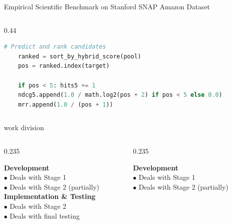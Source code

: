 \documentclass[10pt]{beamer}
\begin{document}
\begin{frame}[fragile]{Empirical Scientific Benchmark on Stanford SNAP Amazon Dataset}
\begin{columns}[T]
\begin{column}{0.44\textwidth}
\begin{lstlisting}[language=Python]
    # Predict and rank candidates
    ranked = sort_by_hybrid_score(pool)
    pos = ranked.index(target)
    
    if pos < 5: hits5 += 1
    ndcg5.append(1.0 / math.log2(pos + 2) if pos < 5 else 0.0)
    mrr.append(1.0 / (pos + 1))
\end{lstlisting}
    \end{column}
\end{columns}
\end{frame}

\begin{frame}{work division}
\vspace*{0.3cm}
\begin{columns}[T]
    \begin{column}{0.235\textwidth}
        \begin{tcolorbox}[colback=cardbg,colframe=bordergray,arc=2.5mm,boxrule=1pt,top=6mm,bottom=6mm,left=4mm,right=4mm]
            {\fontsize{9}{12}\selectfont \textbf{\color{brandorange} Development}}\\[0.15cm]
            {\fontsize{8}{11}\selectfont $\bullet$ Deals with Stage 1}\\[0.08cm]
            {\fontsize{8}{11}\selectfont $\bullet$ Deals with Stage 2 (partially)}\\[0.55cm]
            {\fontsize{9}{12}\selectfont \textbf{\color{brandred} Implementation \& Testing}}\\[0.15cm]
            {\fontsize{8}{11}\selectfont $\bullet$ Deals with Stage 2}\\[0.08cm]
            {\fontsize{8}{11}\selectfont $\bullet$ Deals with final testing}
        \end{tcolorbox}
    \end{column}%
    \begin{column}{0.235\textwidth}
        \begin{tcolorbox}[colback=cardbg,colframe=bordergray,arc=2.5mm,boxrule=1pt,top=6mm,bottom=6mm,left=4mm,right=4mm]
            {\fontsize{9}{12}\selectfont \textbf{\color{brandorange} Development}}\\[0.15cm]
            {\fontsize{8}{11}\selectfont $\bullet$ Deals with Stage 1}\\[0.08cm]
            {\fontsize{8}{11}\selectfont $\bullet$ Deals with Stage 2 (partially)}\\[0.55cm]

\end{tcolorbox}
\end{column}
\end{columns}
\end{frame}
\end{document}
